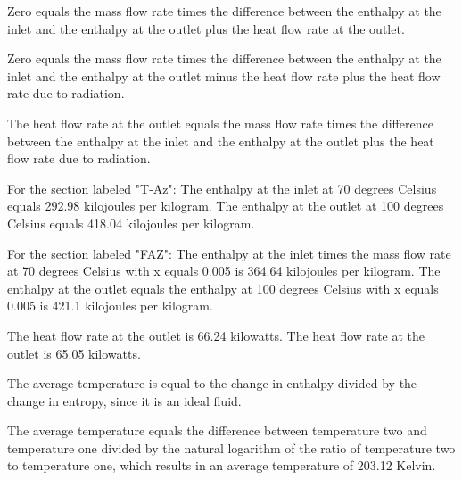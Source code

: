Zero equals the mass flow rate times the difference between the enthalpy at the inlet and the enthalpy at the outlet plus the heat flow rate at the outlet.

Zero equals the mass flow rate times the difference between the enthalpy at the inlet and the enthalpy at the outlet minus the heat flow rate plus the heat flow rate due to radiation.

The heat flow rate at the outlet equals the mass flow rate times the difference between the enthalpy at the inlet and the enthalpy at the outlet plus the heat flow rate due to radiation.

For the section labeled "T-Az":
The enthalpy at the inlet at 70 degrees Celsius equals 292.98 kilojoules per kilogram.
The enthalpy at the outlet at 100 degrees Celsius equals 418.04 kilojoules per kilogram.

For the section labeled "FAZ":
The enthalpy at the inlet times the mass flow rate at 70 degrees Celsius with x equals 0.005 is 364.64 kilojoules per kilogram.
The enthalpy at the outlet equals the enthalpy at 100 degrees Celsius with x equals 0.005 is 421.1 kilojoules per kilogram.

The heat flow rate at the outlet is 66.24 kilowatts.
The heat flow rate at the outlet is 65.05 kilowatts.

The average temperature is equal to the change in enthalpy divided by the change in entropy, since it is an ideal fluid.

The average temperature equals the difference between temperature two and temperature one divided by the natural logarithm of the ratio of temperature two to temperature one, which results in an average temperature of 203.12 Kelvin.